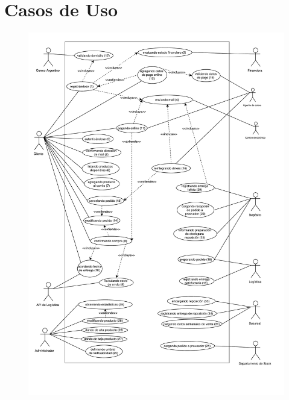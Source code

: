 \section{Casos de Uso}

\begin{figure}[H]
  \begin{center}
  \includegraphics[width=500px]{images/casos-de-uso.pdf}
  \end{center}
\end{figure}

\captionsetup[table]{name=Caso de uso}

